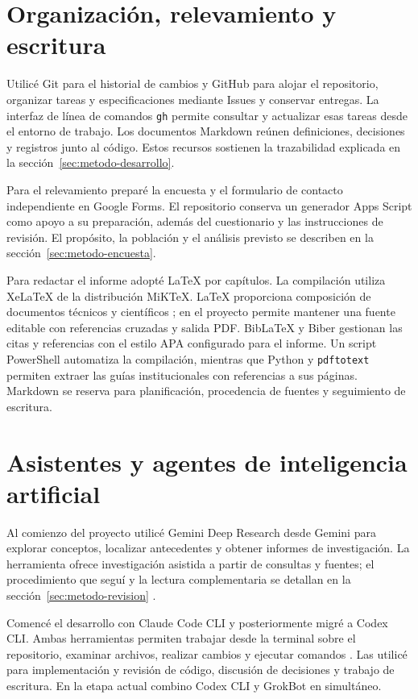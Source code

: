 \section{Organización, relevamiento y escritura}
\label{sec:herramientas-documentacion}
Utilicé Git para el historial de cambios y GitHub para alojar el repositorio,
organizar tareas y especificaciones mediante Issues y conservar entregas.
La interfaz de línea de comandos \texttt{gh} permite consultar y actualizar
esas tareas desde el entorno de trabajo. Los documentos Markdown reúnen
definiciones, decisiones y registros junto al código. Estos recursos sostienen
la trazabilidad explicada en la sección~\ref{sec:metodo-desarrollo}.

Para el relevamiento preparé la encuesta y el formulario de contacto independiente
en Google Forms. El repositorio conserva un generador Apps Script como apoyo a
su preparación, además del cuestionario y las instrucciones de revisión. El propósito,
la población y el análisis previsto se describen en la
sección~\ref{sec:metodo-encuesta}.

Para redactar el informe adopté LaTeX por capítulos. La compilación utiliza
XeLaTeX de la distribución \mbox{MiKTeX}. LaTeX proporciona composición de documentos
técnicos y científicos
\parencite{latexIntroduccion}; en el proyecto permite mantener una fuente editable
con referencias cruzadas y salida PDF. BibLaTeX y Biber gestionan las citas y
referencias con el estilo APA configurado para el informe. Un script PowerShell
automatiza la compilación, mientras que Python y \texttt{pdftotext} permiten
extraer las guías institucionales con referencias a sus páginas. Markdown se
reserva para planificación, procedencia de fuentes y seguimiento de escritura.

\section{Asistentes y agentes de inteligencia artificial}
\label{sec:herramientas-ia}
Al comienzo del proyecto utilicé Gemini Deep Research desde Gemini para explorar
conceptos, localizar antecedentes y obtener informes de investigación.
La herramienta ofrece investigación asistida a partir de consultas y fuentes;
el procedimiento que seguí y la lectura complementaria se detallan en la
sección~\ref{sec:metodo-revision} \parencite{geminiDeepResearch}.

Comencé el desarrollo con Claude Code CLI y posteriormente migré a Codex CLI.
Ambas herramientas permiten trabajar desde la terminal sobre el repositorio,
examinar archivos, realizar cambios y ejecutar comandos
\parencite{anthropicClaudeCode,openaiCodexCli}.
Las utilicé para implementación y revisión de código, discusión de decisiones
y trabajo de escritura. En la etapa actual combino Codex CLI y GrokBot en
simultáneo.

